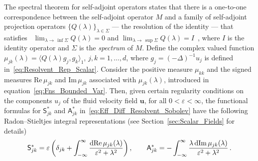 \documentclass[leqno,onefignum,onetabnum]{siamltex1213}
\newcommand{\secref}[1]{Section~\ref{#1}}
\renewcommand{\d}{\mathrm{d}}
\newcommand\Real{\mbox{Re}\,} %
\newcommand\Imag{\mbox{Im}\,} %
\newcommand{\Sm}{\mathsf{S}}
\newcommand{\Am}{\mathsf{A}}
\newcommand{\vecu}{\boldsymbol{u}}
\begin{document}
The spectral theorem for self-adjoint operators states that there is a
one-to-one correspondence between the self-adjoint operator $M$ and a
family of self-adjoint projection operators $\{Q(\lambda)\}_{\lambda\in\Sigma}$ --- the
resolution of the identity --- that satisfies~\cite{Stone:64} 
$\lim_{\lambda\to\,\inf{\Sigma}}Q(\lambda)=0$ and
$\lim_{\lambda\to\,\sup{\Sigma}}Q(\lambda)=I$~\cite{Stone:64}, where $I$ is the identity
operator and $\Sigma$ is the \emph{spectrum} of $M$. Define the complex
valued function $\mu_{jk}(\lambda)=\langle Q(\lambda)g_j,g_k\rangle_1$, $j,k=1,\ldots,d$, where
$g_j=(-\Delta)^{-1}u_j$ is defined
in~\eqref{eq:Resolvent_Rep_Scalar}. Consider the positive measure
$\mu_{kk}$ and the signed measures $\Real\mu_{jk}$ and $\Imag\mu_{jk}$
associated with $\mu_{jk}(\lambda)$, introduced in
equation~\eqref{eq:Fns_Bounded_Var}.  Then, given certain regularity 
conditions on the components $u_j$ of the fluid velocity field
$\vecu$, for all $0<\varepsilon<\infty$, the functional formulas for $\Sm^*_{jk}$ and
$\Am^*_{jk}$ in~\eqref{eq:Eff_Diff_Resolvent_Sobolev} have
the following Radon--Stieltjes integral representations (see
\secref{sec:Scalar_Fields} for details)
%
  \begin{align}\label{eq:Integral_Rep_kappa*}
    \Sm^*_{jk}=\varepsilon\left(\delta_{jk}+\int_{-\infty}^\infty\frac{\d{\rm Re}\,\mu_{jk}(\lambda)}{\varepsilon^2+\lambda^2}\right),
    \qquad
    \Am^*_{jk}=-\int_{-\infty}^\infty\frac{\lambda\,\d{\rm Im}\,\mu_{jk}(\lambda)}{\varepsilon^2+\lambda^2}\,.         
\end{align}
\end{document}
